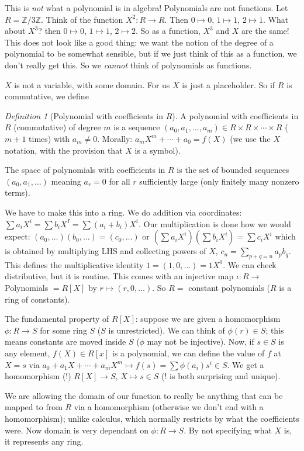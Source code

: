\documentclass{article}
\theoremstyle{plain}
\theoremstyle{remark}
\newtheorem{definition}{Definition}
\newcommand{\Z}{{\mathbb Z}}
\begin{document}
This is \emph{not} what a polynomial is in algebra!
Polynomials are not functions.
Let $R = \Z/3\Z$.
Think of the function $X^2 \colon R \to R$.
Then $0 \mapsto 0$, $1 \mapsto 1$, $2 \mapsto 1$.
What about $X^3$?
then $0 \mapsto 0$, $1 \mapsto 1$, $2 \mapsto 2$.
So as a function, $X^3$ and $X$ are the same!
This does not look like a good thing:
we want the notion of the degree of a polynomial to be somewhat sensible,
but if we just think of this as a function, we don't really get this.
So we \emph{cannot} think of polynomials as functions.

$X$ is not a variable, with some domain.
For us $X$ is just a placeholder.
So if $R$ is commutative, we define
\begin{definition}[Polynomial with coefficients in $R$]
	A polynomial with coefficients in $R$ (commutative) of degree $m$
	is a sequence $(a_0,a_1,\dots,a_m) \in R \times R \times \cdots \times R$
	($m+1$ times) with $a_m \neq 0$.
	Morally: $a_mX^m + \cdots + a_0 = f(X)$
	(we use the $X$ notation, with the provision that $X$ is a symbol).
\end{definition}
The space of polynomials with coefficients in $R$ is the set
of bounded sequences $(a_0,a_1,\dots)$ meaning $a_r = 0$
for all $r$ sufficiently large (only finitely many nonzero terms).

We have to make this into a ring.
We do addition via coordinates: $\sum a_iX^i = \sum b_iX^I = \sum(a_i+b_i)X^i$.
Our multiplication is done how we would expect:
$(a_0,\dots)(b_0,\dots) = (c_0,\dots)$ or
$(\sum a_iX^i)(\sum b_i X^i) = \sum c_iX^i$
which is obtained by multiplying LHS and collecting powers of $X$,
$c_n = \sum_{p+q=n} a_p b_q$.
This defines the multiplicative identity $1 = (1,0,\dots) = 1X^0$.
We can check distributive, but it is routine.
This comes with an injective map $\iota \colon R \to $ Polynomials
$ = R[X]$ by $r \mapsto (r,0,\dots)$.
So $R =$ constant polynomials ($R$ is a ring of constants).

The fundamental property of $R[X]$:
suppose we are given a homomorphism $\phi \colon R \to S$ for
some ring $S$ ($S$ is unrestricted).
We can think of $\phi(r) \in S$; this means constants are moved inside $S$
($\phi$ may not be injective).
Now, if $s \in S$ is any element, $f(X) \in R[x]$ is a polynomial,
we can define the value of $f$ at $X = s$ via
$a_0 + a_1X + \cdots + a_mX^m \mapsto f(s) = \sum\phi(a_i)s^i \in S$.
We get a homomorphism (!) $R[X] \to S$, $X \mapsto s \in S$
(! is both surprising and unique).

We are allowing the domain of our function to really be anything that
can be mapped to from $R$ via a homomorphism (otherwise we don't end with a homomorphism);
unlike calculus, which normally restricts by what the coefficients were.
Now domain is very dependant on $\phi \colon R \to S$.
By not specifying what $X$ is, it represents any ring.
\end{document}
